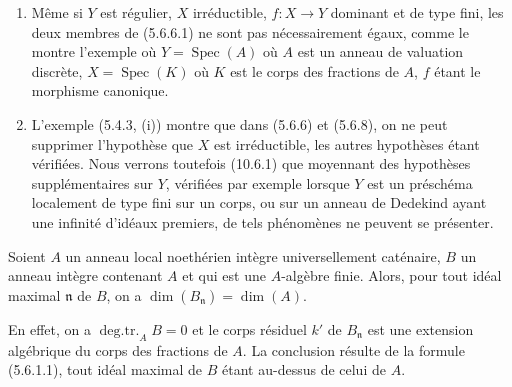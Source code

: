 \begin{remarks}[5.6.9]
\label{IV.2.s5.6.9-fr}
\begin{enumerate}
\item[(i)] Même si $Y$ est régulier, $X$ irréductible, $f:X\to Y$ dominant
et de type fini, les deux membres de (5.6.6.1) ne sont pas nécessairement
égaux, comme le montre l'exemple où $Y=\operatorname{Spec}(A)$ où $A$ est un
anneau de valuation discrète, $X=\operatorname{Spec}(K)$ où $K$ est le corps
des fractions de $A$, $f$ étant le morphisme canonique.
\item[(ii)] L'exemple (5.4.3, (i)) montre que dans (5.6.6) et (5.6.8), on ne
peut supprimer l'hypothèse que $X$ est irréductible, les autres hypothèses
étant vérifiées. Nous verrons toutefois (10.6.1) que moyennant des hypothèses
supplémentaires sur $Y$, vérifiées par exemple lorsque $Y$ est un préschéma
localement de type fini sur un corps, ou sur un anneau de Dedekind ayant une
infinité d'idéaux premiers, de tels phénomènes ne peuvent se présenter.
\end{enumerate}
\end{remarks}

\begin{proposition}[5.6.10]
\label{IV.2.s5.6.10-fr}
Soient $A$ un anneau local noethérien intègre universellement caténaire, $B$
un anneau intègre contenant $A$ et qui est une $A$-algèbre finie. Alors, pour
tout idéal maximal $\mathfrak n$ de $B$, on a
$\dim(B_{\mathfrak n})=\dim(A)$.
\end{proposition}

En effet, on a $\operatorname{deg.tr.}_A B=0$ et le corps résiduel $k'$ de
$B_{\mathfrak n}$ est une extension algébrique du corps des fractions de
$A$. La conclusion résulte de la formule (5.6.1.1), tout idéal maximal de
$B$ étant au-dessus de celui de $A$.

